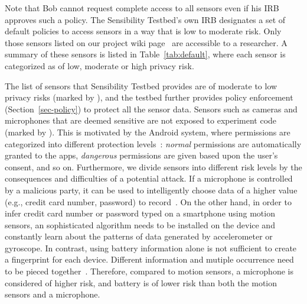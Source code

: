 Note that Bob cannot request complete access to all sensors 
even if his IRB approves such a policy. The Sensibility Testbed's
own IRB designates a set of default policies to access sensors in a
way that is low to moderate risk. 
Only those sensors listed on our project 
wiki page~\cite{sensor-api} are accessible to a researcher. 
A summary of these sensors is listed in Table~\ref{tab:default}, 
where each sensor is categorized as of low, moderate or high 
privacy risk.

The list of sensors that Sensibility Testbed provides are of moderate 
to low privacy risks (marked by \tickmark), and the testbed further provides policy enforcement
(Section~\ref{sec-policy}) to protect all the sensor data. Sensors 
such as cameras and microphones that are deemed sensitive are not 
exposed to experiment code (marked by \xmark). This is motivated by the Android system, 
where permissions are categorized into different protection levels~\cite{level}:
\textit{normal} permissions are automatically granted to the apps, 
\textit{dangerous} permissions are given based upon the 
user's consent, and so on. Furthermore, 
we divide sensors into different risk levels by the consequences and 
difficulties of a potential attack. If a microphone is controlled by 
a malicious party, it can be used to intelligently choose data of a 
higher value (e.g., credit card number, password) to record~\cite{zhang2015leave}. On the other 
hand, in order to infer credit card number or password typed on a 
smartphone using motion sensors, an sophisticated algorithm needs to 
be installed on the device and constantly learn about  
the patterns of data generated by accelerometer or gyroscope. In contrast,
using battery information alone is not sufficient to create a fingerprint 
for each device. Different information and mutiple occurrence need to
be pieced together~\cite{battery-priv}. Therefore, 
compared to motion sensors, a microphone is considered of higher risk, 
and battery is of lower risk than both the motion sensors and a microphone.

